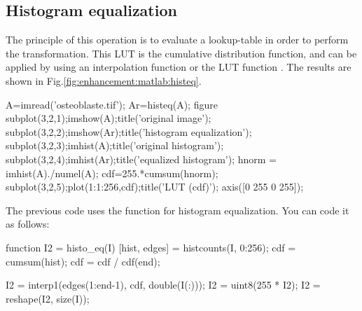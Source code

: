 \subsection{Histogram equalization}
The principle of this operation is to evaluate a lookup-table in order to perform the transformation. This LUT is the cumulative distribution function, and can be applied by using an interpolation function  or the LUT function . The results are shown in Fig.\ref{fig:enhancement:matlab:histeq}.
\begin{matlab}
A=imread('osteoblaste.tif');
Ar=histeq(A);
figure
subplot(3,2,1);imshow(A);title('original image');
subplot(3,2,2);imshow(Ar);title('histogram equalization');
subplot(3,2,3);imhist(A);title('original histogram');
subplot(3,2,4);imhist(Ar);title('equalized histogram');
hnorm = imhist(A)./numel(A);
cdf=255.*cumsum(hnorm);
subplot(3,2,5);plot(1:1:256,cdf);title('LUT (cdf)');
axis([0 255 0 255]);
\end{matlab}

The previous code uses the \matlabregistered{} function for histogram equalization. You can code it as follows:
\begin{matlab}
function I2 = histo_eq(I)
%
%
[hist, edges] = histcounts(I, 0:256);
cdf = cumsum(hist);
cdf = cdf / cdf(end);


I2 = interp1(edges(1:end-1), cdf, double(I(:)));
I2 = uint8(255 * I2);
I2 = reshape(I2, size(I));
\end{matlab}


